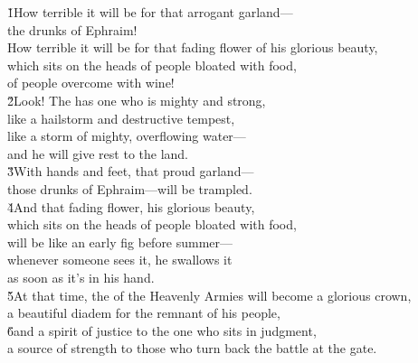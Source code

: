 \begin{poetry}
\poeml {}
\v{1}How terrible it will be for that arrogant garland--- \\
\poeml the drunks of Ephraim! \\
\poeml How terrible it will be for that fading flower of his glorious beauty, \\
\poemll    which sits on the heads of people bloated with food, \\
\poemlll       of people overcome with wine! \\
\poeml \v{2}Look! The  has one who is mighty and strong, \\
\poemll    like a hailstorm and destructive tempest, \\
\poeml like a storm of mighty, overflowing water--- \\
\poemll    and he will give rest to the land. \\
\poeml \v{3}With hands and feet, that proud garland--- \\
\poemll    those drunks of Ephraim---will be trampled. \\
\poeml \v{4}And that fading flower, his glorious beauty, \\
\poemll    which sits on the heads of people bloated with food, \\
\poeml will be like an early fig before summer--- \\
\poemll    whenever someone sees it, he swallows it \\
\poemlll       as soon as it's in his hand. \\
\poeml \v{5}At that time, the  of the Heavenly Armies will become a glorious crown, \\
\poemll    a beautiful diadem for the remnant of his people, \\
\poeml \v{6}and a spirit of justice to the one who sits in judgment, \\
\poemll    a source of strength to those who turn back the battle at the gate. \\

\end{poetry}
